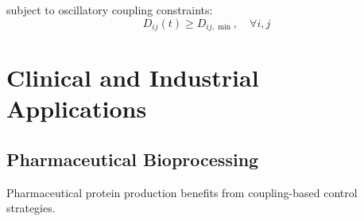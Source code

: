 \documentclass[twocolumn]{article}
\begin{document}
subject to oscillatory coupling constraints:
\begin{equation}
D_{ij}(t) \geq D_{ij,\min}, \quad \forall i,j
\label{eq:coupling_constraints}
\end{equation}

\section{Clinical and Industrial Applications}

\subsection{Pharmaceutical Bioprocessing}

Pharmaceutical protein production benefits from coupling-based control strategies.
\end{document}
